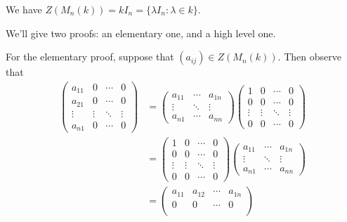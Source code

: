 \begin{prop}{}
    We have $Z(M_n(k)) = kI_n = \{\lambda I_n : \lambda \in k\}$. 
\end{prop}
\begin{pf}
    We'll give two proofs: an elementary one, and a high level one. 

    For the elementary proof, suppose that $(a_{ij}) \in Z(M_n(k))$. 
    Then observe that 
    \begin{align*} 
         \begin{pmatrix} 
            a_{11} & 0 & \cdots & 0 \\ 
            a_{21} & 0 & \cdots & 0 \\ 
            \vdots & \vdots & \ddots & \vdots \\ 
            a_{n1} & 0 & \cdots & 0 
        \end{pmatrix} &= \begin{pmatrix}
            a_{11} & \cdots & a_{1n} \\ 
            \vdots & \ddots & \vdots \\
            a_{n1} & \cdots & a_{nn} 
        \end{pmatrix} \begin{pmatrix} 
            1 & 0 & \cdots & 0 \\ 
            0 & 0 & \cdots & 0 \\
            \vdots & \vdots & \ddots & \vdots \\
            0 & 0 & \cdots & 0
        \end{pmatrix} \\ &= \begin{pmatrix} 
            1 & 0 & \cdots & 0 \\ 
            0 & 0 & \cdots & 0 \\
            \vdots & \vdots & \ddots & \vdots \\
            0 & 0 & \cdots & 0
        \end{pmatrix} \begin{pmatrix}
            a_{11} & \cdots & a_{1n} \\ 
            \vdots & \ddots & \vdots \\
            a_{n1} & \cdots & a_{nn} 
        \end{pmatrix} \\ &= \begin{pmatrix}
            a_{11} & a_{12} & \cdots & a_{1n} \\
            0 & 0 & \cdots & 0 \\ 

\end{pmatrix}
\end{align*}
\end{pf}
